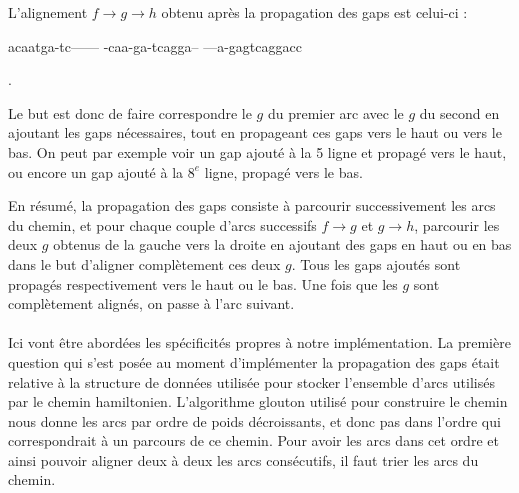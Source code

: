 \documentclass{article}
\begin{document}
L'alignement $f \to g \to h$ obtenu après la propagation des gaps est celui-ci : 

\begin{boxedverbatim}
acaatga-tc------
-caa-ga-tcagga--
---a-gagtcaggacc
\end{boxedverbatim}.

Le but est donc de faire correspondre le $g$ du premier arc avec le $g$ du second en ajoutant les gaps nécessaires, tout en propageant ces gaps vers le haut ou vers le bas. On peut par exemple voir un gap ajouté à la 5 ligne et propagé vers le haut, ou encore un gap ajouté à la $8^e$ ligne, propagé vers le bas.

En résumé, la propagation des gaps consiste à parcourir successivement les arcs du chemin, et pour chaque couple d'arcs successifs
$f \to g$ et $g \to h$, parcourir les deux $g$ obtenus de la gauche vers la droite en ajoutant des gaps en haut ou en bas dans le but d'aligner complètement ces deux $g$. Tous les gaps ajoutés sont propagés respectivement vers le haut ou le bas. Une fois que les $g$ sont complètement alignés, on passe à l'arc suivant.
\\~\\


Ici vont être abordées les spécificités propres à notre implémentation. La première question qui s'est posée au moment d'implémenter la propagation des gaps était relative à la structure de données utilisée pour stocker l'ensemble d'arcs utilisés par le chemin hamiltonien. 
L'algorithme glouton utilisé pour construire le chemin nous donne les arcs par ordre de poids décroissants, et donc pas dans l'ordre qui correspondrait à un parcours de ce chemin. Pour avoir les arcs dans cet ordre et ainsi pouvoir aligner deux à deux les arcs consécutifs, il faut trier les arcs du chemin.
\end{document}
